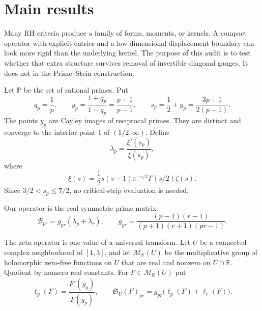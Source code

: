 \documentclass[11pt]{article}
\theoremstyle{definition}
\theoremstyle{remark}
\newcommand{\R}{\mathbb R}
\newcommand{\PP}{\mathbb P}
\newcommand{\cB}{\mathcal B}
\begin{document}
\section{Main results}
\label{sec:intro}

Many RH criteria produce a family of forms, moments, or kernels.  A compact operator with
explicit entries and a low-dimensional displacement boundary can look more rigid than the
underlying kernel.  The purpose of this audit is to test whether that extra structure survives
removal of invertible diagonal gauges.  It does not in the Prime--Stein construction.

Let $\PP$ be the set of rational primes.  Put
\begin{equation}
 q_p=\frac1p,\qquad
 y_p=\frac{1+q_p}{1-q_p}=\frac{p+1}{p-1},\qquad
 s_p=\frac12+y_p=\frac{3p+1}{2(p-1)}.                 \tag{1.1}
\end{equation}
The points $y_p$ are Cayley images of reciprocal primes.  They are distinct and converge to the
interior point $1$ of $(1/2,\infty)$.  Define
\begin{equation}
 \lambda_p=\frac{\xi'(s_p)}{\xi(s_p)},                  \tag{1.2}
\end{equation}
where
\[
 \xi(s)=\frac12s(s-1)\pi^{-s/2}\Gamma(s/2)\zeta(s).
\]
Since $3/2<s_p\leq7/2$, no critical-strip evaluation is needed.

Our operator is the real symmetric prime matrix
\begin{equation}
 \boxed{\quad
 \cB_{pr}=g_{pr}(\lambda_p+\lambda_r),\qquad
 g_{pr}=\frac{(p-1)(r-1)}
 {(p+1)(r+1)(pr-1)}.
 \quad}                                                   \tag{1.3}
\end{equation}

The zeta operator is one value of a universal transform.  Let $U$ be a connected complex
neighborhood of $[1,3]$, and let $\mathcal M_{\R}(U)$ be the multiplicative group of holomorphic
zero-free functions on $U$ that are real and nonzero on $U\cap\R$.  Quotient by nonzero real
constants.  For $F\in\mathcal M_{\R}(U)$ put
\begin{equation}
 \ell_p(F)=\frac{F'(y_p)}{F(y_p)},\qquad
 \mathfrak S_U(F)_{pr}=g_{pr}\bigl(\ell_p(F)+\ell_r(F)\bigr).
                                                               \tag{PSL-0}
\end{equation}
\end{document}
